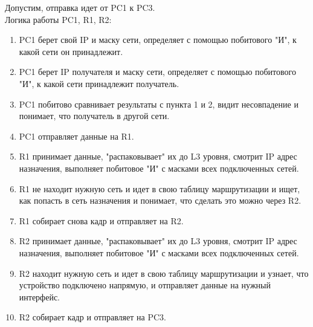 Допустим, отправка идет от PC1 к PC3. \\

Логика работы PC1, R1, R2:

\begin{enumerate}
    \item PC1 берет свой IP и маску сети, определяет с помощью побитового "И", к какой сети он принадлежит.
    \item PC1 берет IP получателя и маску сети, определяет с помощью побитового "И", к какой сети принадлежит получатель.
    \item PC1 побитово сравнивает результаты с пункта 1 и 2, видит несовпадение и понимает, что получатель в другой сети.
    \item PC1 отправляет данные на R1.
    \item R1 принимает данные, "распаковывает" их до L3 уровня, смотрит IP адрес назначения, выполняет побитовое "И" с масками всех подключенных сетей.
    \item R1 не находит нужную сеть и идет в свою таблицу маршрутизации и ищет, как попасть в сеть назначения и понимает, что сделать это можно через R2.
    \item R1 собирает снова кадр и отправляет на R2.
    \item R2 принимает данные, "распаковывает" их до L3 уровня, смотрит IP адрес назначения, выполняет побитовое "И" с масками всех подключенных сетей.
    \item R2 находит нужную сеть и идет в свою таблицу маршрутизации и узнает, что устройство подключено напрямую, и отправляет данные на нужный интерфейс.
    \item R2 собирает кадр и отправляет на PC3.
\end{enumerate}

\endinput